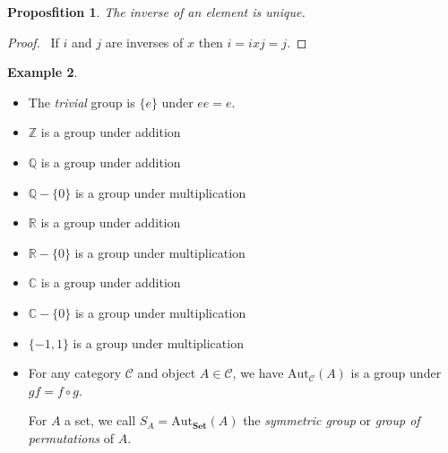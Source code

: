 \documentclass{book}
\let\qed\relax
\newtheorem{prop}{Proposfition}[chapter]
\theoremstyle{definition}
\newtheorem{ex}[prop]{Example}
\newcommand{\Aut}[2]{\ensuremath{\mathrm{Aut}_{#1} \left( {#2} \right)}}
\newcommand{\Set}{\ensuremath{\mathbf{Set}}}
\begin{document}
\begin{prop}
    \label{prop:grp-inv-unique}
    The inverse of an element is unique.
\end{prop}

\begin{proof}
    \pf\ If $i$ and $j$ are inverses of $x$ then $i = ixj = j$. \qed
\end{proof}

\begin{ex}
    \begin{itemize}
        \item
              The \emph{trivial} group is $\{e\}$ under $ee = e$.
        \item $\mathbb{Z}$ is a group under addition %
        \item $\mathbb{Q}$ is a group under addition %
        \item $\mathbb{Q} - \{0\}$ is a group under multiplication
        \item $\mathbb{R}$ is a group under addition %
        \item $\mathbb{R} - \{0\}$ is a group under multiplication
        \item $\mathbb{C}$ is a group under addition %
        \item $\mathbb{C} - \{0\}$ is a group under multiplication
        \item $\{-1,1\}$ is a group under multiplication
        \item For any category $\mathcal{C}$ and object $A \in \mathcal{C}$, we have
              $\Aut{\mathcal{C}}{A}$ is a group under $gf = f \circ g$.

              For $A$ a set, we call $S_A = \Aut{\Set}{A}$ the \emph{symmetric group} or
              \emph{group of permutations} of $A$.


\end{itemize}
\end{ex}
\end{document}
